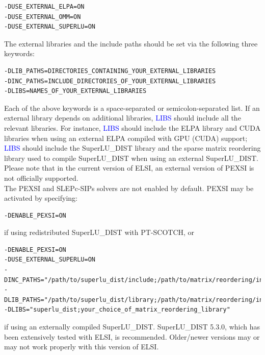 \documentclass{report}
\begin{document}
\begin{verbatim}
-DUSE_EXTERNAL_ELPA=ON
-DUSE_EXTERNAL_OMM=ON
-DUSE_EXTERNAL_SUPERLU=ON
\end{verbatim}

The external libraries and the include paths should be set via the following three keywords:\\

\begin{verbatim}
-DLIB_PATHS=DIRECTORIES_CONTAINING_YOUR_EXTERNAL_LIBRARIES
-DINC_PATHS=INCLUDE_DIRECTORIES_OF_YOUR_EXTERNAL_LIBRARIES
-DLIBS=NAMES_OF_YOUR_EXTERNAL_LIBRARIES
\end{verbatim}

Each of the above keywords is a space-separated or semicolon-separated list.  If an external library depends on additional libraries, \textcolor{blue}{LIBS} should include all the relevant libraries.  For instance, \textcolor{blue}{LIBS} should include the ELPA library and CUDA libraries when using an external ELPA compiled with GPU (CUDA) support; \textcolor{blue}{LIBS} should include the SuperLU\_DIST library and the sparse matrix reordering library used to compile SuperLU\_DIST when using an external SuperLU\_DIST.  Please note that in the current version of ELSI, an external version of PEXSI is not officially supported.\\

The PEXSI and SLEPc-SIPs solvers are not enabled by default.  PEXSI may be activated by specifying:\\

\begin{verbatim}
-DENABLE_PEXSI=ON
\end{verbatim}

if using redistributed SuperLU\_DIST with PT-SCOTCH, or\\

\begin{verbatim}
-DENABLE_PEXSI=ON
-DUSE_EXTERNAL_SUPERLU=ON
-DINC_PATHS="/path/to/superlu_dist/include;/path/to/matrix/reordering/include"
-DLIB_PATHS="/path/to/superlu_dist/library;/path/to/matrix/reordering/include"
-DLIBS="superlu_dist;your_choice_of_matrix_reordering_library"
\end{verbatim}

if using an externally compiled SuperLU\_DIST.  SuperLU\_DIST 5.3.0, which has been extensively tested with ELSI, is recommended.  Older/newer versions may or may not work properly with this version of ELSI.\\
\end{document}
